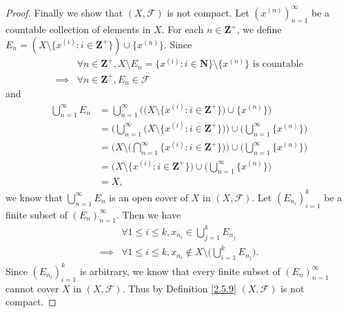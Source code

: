 \begin{proof}
    Finally we show that \((X, \mathcal{F})\) is not compact.
    Let \((x^{(n)})_{n = 1}^\infty\) be a countable collection of elements in \(X\).
    For each \(n \in \mathbf{Z}^+\), we define \(E_n = (X \setminus \{x^{(i)} : i \in \mathbf{Z}^+\}) \cup \{x^{(n)}\}\).
    Since
    \begin{align*}
                 & \forall n \in \mathbf{Z}^+, X \setminus E_n = \{x^{(i)} : i \in \mathbf{N}\} \setminus \{x^{(n)}\} \text{ is countable} \\
        \implies & \forall n \in \mathbf{Z}^+, E_n \in \mathcal{F}
    \end{align*}
    and
    \begin{align*}
        \bigcup_{n = 1}^\infty E_n & = \bigcup_{n = 1}^\infty \Big(\big(X \setminus \{x^{(i)} : i \in \mathbf{Z}^+\}\big) \cup \{x^{(n)}\}\Big)                                        \\
                                   & = \bigg(\bigcup_{n = 1}^\infty \big(X \setminus \{x^{(i)} : i \in \mathbf{Z}^+\}\big)\bigg) \cup \bigg(\bigcup_{n = 1}^\infty \{x^{(n)}\}\bigg)   \\
                                   & = \Bigg(X \setminus \bigg(\bigcap_{n = 1}^\infty \{x^{(i)} : i \in \mathbf{Z}^+\}\bigg)\Bigg) \cup \bigg(\bigcup_{n = 1}^\infty \{x^{(n)}\}\bigg) \\
                                   & = \big(X \setminus \{x^{(i)} : i \in \mathbf{Z}^+\}\big) \cup \bigg(\bigcup_{n = 1}^\infty \{x^{(n)}\}\bigg)                                      \\
                                   & = X,
    \end{align*}
    we know that \(\bigcup_{n = 1}^\infty E_n\) is an open cover of \(X\) in \((X, \mathcal{F})\).
    Let \((E_{n_i})_{i = 1}^k\) be a finite subset of \((E_n)_{n = 1}^\infty\).
    Then we have
    \begin{align*}
                 & \forall 1 \leq i \leq k, x_{n_i} \in \bigcup_{j = 1}^k E_{n_j}                             \\
        \implies & \forall 1 \leq i \leq k, x_{n_i} \notin X \setminus \bigg(\bigcup_{i = 1}^k E_{n_j}\bigg).
    \end{align*}
    Since \((E_{n_i})_{i = 1}^k\) is arbitrary, we know that every finite subset of \((E_n)_{n = 1}^\infty\) cannot cover \(X\) in \((X, \mathcal{F})\).
    Thus by Definition \ref{2.5.9} \((X, \mathcal{F})\) is not compact.
\end{proof}

